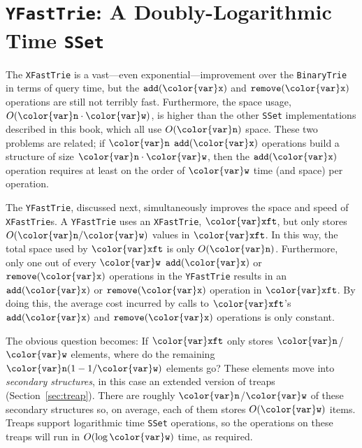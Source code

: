 \documentclass[10pt]{book}
\newcommand{\seclabel}[1]{\label{sec:#1}}
\newcommand{\secref}[1]{Section~\ref{sec:#1}}
\theoremstyle{plain}
\theoremstyle{definition}
\begin{document}
\section{\texttt{YFastTrie}: A Doubly-Logarithmic Time \texttt{SSet}}
\seclabel{yfast}

The \texttt{XFastTrie} is a vast---even exponential---improvement over the
\texttt{BinaryTrie} in terms of query time, but the \ensuremath{\mathtt{add({\color{var}x})}} and \ensuremath{\mathtt{remove({\color{var}x})}}
operations are still not terribly fast.  Furthermore, the space usage,
$O(\ensuremath{\mathtt{{\color{var}n}}}\cdot\ensuremath{\mathtt{{\color{var}w}}})$, is higher than the other \texttt{SSet} implementations
described in this book, which all use $O(\ensuremath{\mathtt{{\color{var}n}}})$ space.  These two
problems are related; if \ensuremath{\mathtt{{\color{var}n}}} \ensuremath{\mathtt{add({\color{var}x})}} operations build a structure of
size $\ensuremath{\mathtt{{\color{var}n}}}\cdot\ensuremath{\mathtt{{\color{var}w}}}$, then the \ensuremath{\mathtt{add({\color{var}x})}} operation requires at least on the
order of \ensuremath{\mathtt{{\color{var}w}}} time (and space) per operation.

%
The \texttt{YFastTrie}, discussed next, simultaneously improves the space and
speed of \texttt{XFastTrie}s.  A \texttt{YFastTrie} uses an \texttt{XFastTrie}, \ensuremath{\mathtt{{\color{var}xft}}}, but only
stores $O(\ensuremath{\mathtt{{\color{var}n}}}/\ensuremath{\mathtt{{\color{var}w}}})$ values in \ensuremath{\mathtt{{\color{var}xft}}}.  In this way, the total space used by
\ensuremath{\mathtt{{\color{var}xft}}} is only $O(\ensuremath{\mathtt{{\color{var}n}}})$.  Furthermore, only one out of every \ensuremath{\mathtt{{\color{var}w}}} \ensuremath{\mathtt{add({\color{var}x})}}
or \ensuremath{\mathtt{remove({\color{var}x})}} operations in the \texttt{YFastTrie} results in an \ensuremath{\mathtt{add({\color{var}x})}} or
\ensuremath{\mathtt{remove({\color{var}x})}} operation in \ensuremath{\mathtt{{\color{var}xft}}}.  By doing this, the average cost incurred
by calls to \ensuremath{\mathtt{{\color{var}xft}}}'s \ensuremath{\mathtt{add({\color{var}x})}} and \ensuremath{\mathtt{remove({\color{var}x})}} operations is only constant.

The obvious question becomes:  If \ensuremath{\mathtt{{\color{var}xft}}} only stores \ensuremath{\mathtt{{\color{var}n}}}/\ensuremath{\mathtt{{\color{var}w}}} elements,
where do the remaining $\ensuremath{\mathtt{{\color{var}n}}}(1-1/\ensuremath{\mathtt{{\color{var}w}}})$ elements go?  These elements move 
into \emph{secondary structures},
%
in this case an extended version of
treaps (\secref{treap}).  There are roughly \ensuremath{\mathtt{{\color{var}n}}}/\ensuremath{\mathtt{{\color{var}w}}} of these secondary
structures so, on average, each of them stores $O(\ensuremath{\mathtt{{\color{var}w}}})$ items.  Treaps
support logarithmic time \texttt{SSet} operations, so the operations on these
treaps will run in $O(\log \ensuremath{\mathtt{{\color{var}w}}})$ time, as required.
\end{document}
